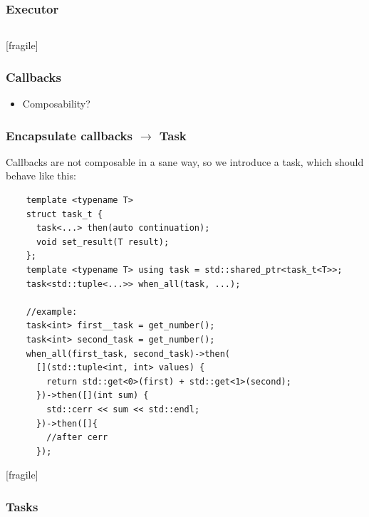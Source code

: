 \begin{frame}[fragile]
	\frametitle{Executor}
	\inputminted[fontsize=\scriptsize,firstline=12,lastline=35]{cpp}{../mixed/src/executor.h}
\end{frame}

\begin{frame}{[fragile]}
	\frametitle{Callbacks}
	\pause
	\begin{itemize}
		\item Composability?
	\end{itemize}
\end{frame}%

\begin{frame}[fragile]
	\frametitle{Encapsulate callbacks $\rightarrow$ Task}
	Callbacks are not composable in a sane way, so we introduce a task, which should behave like this:
	\vspace{3mm}
	\begin{verbatim}
    template <typename T>
    struct task_t { 
      task<...> then(auto continuation);
      void set_result(T result);
    };
    template <typename T> using task = std::shared_ptr<task_t<T>>;
    task<std::tuple<...>> when_all(task, ...);

    //example:
    task<int> first__task = get_number();
    task<int> second_task = get_number();
    when_all(first_task, second_task)->then(
      [](std::tuple<int, int> values) {
        return std::get<0>(first) + std::get<1>(second);
      })->then([](int sum) {
        std::cerr << sum << std::endl;
      })->then([]{
        //after cerr
      });
  \end{verbatim}
\end{frame}

\begin{frame}{[fragile]}
	\frametitle{Tasks }
\end{frame}%

